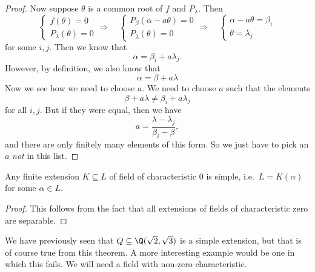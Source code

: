 \documentclass[a4paper]{article}
\begin{document}
\begin{proof}
  Now suppose $\theta$ is a common root of $f$ and $P_\lambda$. Then
  \[
    \begin{cases}
      f(\theta) = 0\\
      P_\lambda(\theta) = 0
    \end{cases}
    \Rightarrow\quad
    \begin{cases}
      P_\beta(\alpha - a\theta) = 0\\
      P_\lambda(\theta) = 0
    \end{cases}
    \Rightarrow\quad
    \begin{cases}
      \alpha - a\theta = \beta_i\\
      \theta = \lambda_j
    \end{cases}
  \]
  for some $i, j$. Then we know that
  \[
    \alpha = \beta_i + a\lambda_j.
  \]
  However, by definition, we also know that
  \[
    \alpha = \beta + a\lambda
  \]
  Now we see how we need to choose $a$. We need to choose $a$ such that the elements
  \[
    \beta + a \lambda \not= \beta_i + a \lambda_j
  \]
  for all $i, j$. But if they were equal, then we have
  \[
    a = \frac{\lambda - \lambda_j}{\beta_i - \beta},
  \]
  and there are only finitely many elements of this form. So we just have to pick an $a$ \emph{not} in this list.
\end{proof}

\begin{cor}
  Any finite extension $K \subseteq L$ of field of characteristic $0$ is simple, i.e.\ $L = K(\alpha)$ for some $\alpha \in L$.
\end{cor}

\begin{proof}
  This follows from the fact that all extensions of fields of characteristic zero are separable.
\end{proof}

We have previously seen that $Q\subseteq \Q(\sqrt{2}, \sqrt{3})$ is a simple extension, but that is of course true from this theorem. A more interesting example would be one in which this fails. We will need a field with non-zero characteristic.
\end{document}
